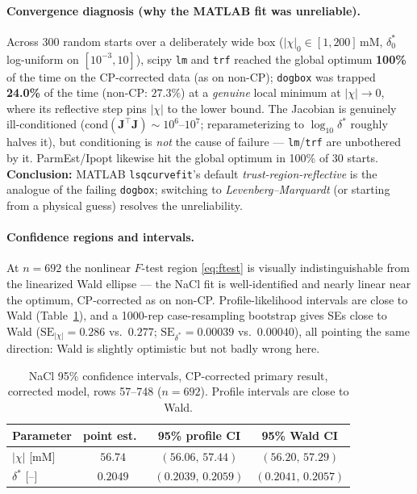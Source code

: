 \documentclass[11pt]{article}
\newcommand{\dstar}{\delta^{*}}
\begin{document}
\paragraph{Convergence diagnosis (why the MATLAB fit was unreliable).}
Across 300 random starts over a deliberately wide box ($|\chi|_0\in[1,200]$\,mM,
$\dstar_0$ log-uniform on $[10^{-3},10]$), scipy \texttt{lm} and \texttt{trf}
reached the global optimum \textbf{100\%} of the time on the CP-corrected data
(as on non-CP); \texttt{dogbox} was trapped \textbf{24.0\%} of the time
(non-CP: $27.3\%$) at a \emph{genuine} local minimum at $|\chi|\to0$, where its
reflective step pins $|\chi|$ to the lower bound. The Jacobian is genuinely ill-conditioned
($\mathrm{cond}(\mathbf J^\top\mathbf J)\sim10^6$--$10^7$; reparameterizing to
$\log_{10}\dstar$ roughly halves it), but conditioning is \emph{not} the cause of
failure --- \texttt{lm}/\texttt{trf} are unbothered by it. ParmEst/Ipopt likewise
hit the global optimum in 100\% of 30 starts. \textbf{Conclusion:} MATLAB
\texttt{lsqcurvefit}'s default \emph{trust-region-reflective} is the analogue of
the failing \texttt{dogbox}; switching to \emph{Levenberg--Marquardt} (or starting
from a physical guess) resolves the unreliability.

\paragraph{Confidence regions and intervals.} At $n=692$ the nonlinear $F$-test
region \eqref{eq:ftest} is visually indistinguishable from the linearized Wald
ellipse --- the NaCl fit is well-identified and nearly linear near the optimum,
CP-corrected as on non-CP. Profile-likelihood intervals are close to Wald
(Table~\ref{tab:ci}), and a 1000-rep case-resampling bootstrap gives SEs close
to Wald ($\mathrm{SE}_{|\chi|}=0.286$ vs.\ $0.277$; $\mathrm{SE}_{\dstar}=0.00039$
vs.\ $0.00040$), all pointing the same direction: Wald is slightly optimistic but
not badly wrong here.

\begin{table}[H]
\centering\small
\begin{tabular}{lccc}
\toprule
Parameter & point est.\ & 95\% profile CI & 95\% Wald CI \\
\midrule
$|\chi|$ [\si{mM}] & $56.74$ & $(56.06,\,57.44)$ & $(56.20,\,57.29)$\\
$\dstar$ [--]      & $0.2049$ & $(0.2039,\,0.2059)$ & $(0.2041,\,0.2057)$\\
\bottomrule
\end{tabular}
\caption{NaCl 95\% confidence intervals, CP-corrected primary result,
corrected model, rows 57--748 ($n=692$). Profile intervals are close to Wald.}
\label{tab:ci}
\end{table}
\end{document}
